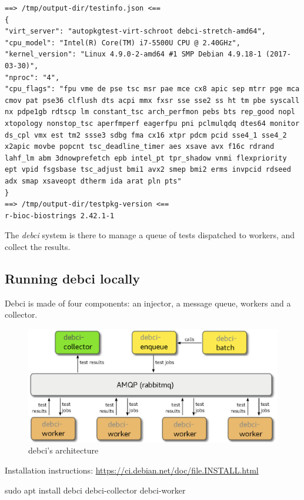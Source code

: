 \documentclass[mingoth,a4paper]{jsarticle}
\begin{document}
\begin{verbatim}
==> /tmp/output-dir/testinfo.json <==
{
"virt_server": "autopkgtest-virt-schroot debci-stretch-amd64",
"cpu_model": "Intel(R) Core(TM) i7-5500U CPU @ 2.40GHz",
"kernel_version": "Linux 4.9.0-2-amd64 #1 SMP Debian 4.9.18-1 (2017-03-30)",
"nproc": "4",
"cpu_flags": "fpu vme de pse tsc msr pae mce cx8 apic sep mtrr pge mca cmov pat pse36 clflush dts acpi mmx fxsr sse sse2 ss ht tm pbe syscall nx pdpe1gb rdtscp lm constant_tsc arch_perfmon pebs bts rep_good nopl xtopology nonstop_tsc aperfmperf eagerfpu pni pclmulqdq dtes64 monitor ds_cpl vmx est tm2 ssse3 sdbg fma cx16 xtpr pdcm pcid sse4_1 sse4_2 x2apic movbe popcnt tsc_deadline_timer aes xsave avx f16c rdrand lahf_lm abm 3dnowprefetch epb intel_pt tpr_shadow vnmi flexpriority ept vpid fsgsbase tsc_adjust bmi1 avx2 smep bmi2 erms invpcid rdseed adx smap xsaveopt dtherm ida arat pln pts"
}
==> /tmp/output-dir/testpkg-version <==
r-bioc-biostrings 2.42.1-1
\end{verbatim}

The \emph{debci} system is there to manage a queue of tests dispatched
to workers, and collect the results.

\subsection{Running debci locally}\label{running-debci-locally}

Debci is made of four components: an injector, a message queue, workers
and a collector.

\begin{figure}[htbp]
\centering
\includegraphics{./image201706/architecture.eps}
\caption{debci's architecture}
\end{figure}

Installation instructions:
\url{https://ci.debian.net/doc/file.INSTALL.html}

sudo apt install debci debci-collector debci-worker
\end{document}
